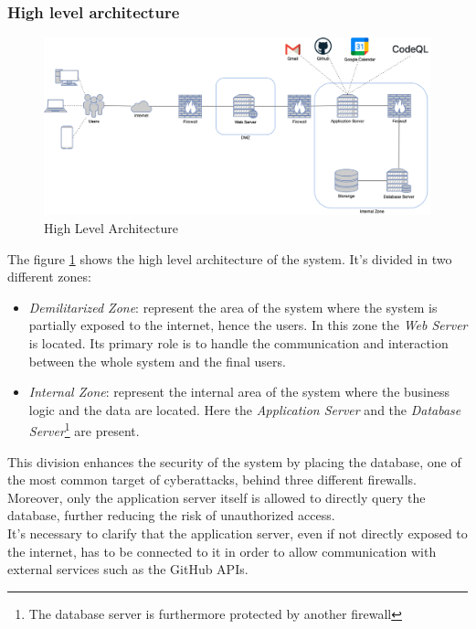 \documentclass[../DD.tex]{subfiles}
\begin{document}
        \subsubsection{High level architecture}\label{subsubsec:high_level_architecture}
        \begin{figure}[H]
            \centering
            \includegraphics[width=\textwidth]{../assets/section_2/high_level_architecture.png}
            \caption{High Level Architecture}
            \label{fig:high_level_architecture}
        \end{figure}
        The figure \ref{fig:high_level_architecture} shows the high level architecture of the system.
        It's divided in two different zones:
        \begin{itemize}
            \item {\textit{Demilitarized Zone}: represent the area of the system where the system is partially exposed to the internet, hence the users.
            In this zone the \textit{Web Server} is located.
            Its primary role is to handle the communication and interaction between the whole system and the final users.}
            \item {\textit{Internal Zone}: represent the internal area of the system where the business logic and the data are located.
            Here the \textit{Application Server} and the \textit{Database Server}\footnote{The database server is furthermore protected by another firewall} are present.}
        \end{itemize}
        This division enhances the security of the system by placing the database, one of the most common target of cyberattacks, behind three different firewalls.
        Moreover, only the application server itself is allowed to directly query the database, further reducing the risk of unauthorized access.\\
        It's necessary to clarify that the application server, even if not directly exposed to the internet, has to be connected to it in order to allow communication with external services such as the GitHub APIs.
\end{document}
